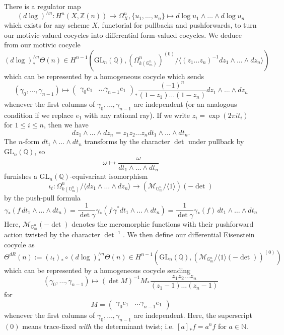 \documentclass[10pt]{amsart}
\theoremstyle{definition}
\newcommand{\Q}{\mathbb{Q}}
\newcommand{\G}{\mathbb{G}}
\newcommand{\GL}{\mathrm{GL}}
\numberwithin{equation}{section}
\begin{document}
    There is a regulator map \cite[\S 2.1.5]{LW}
    \[
    (d\log)^{\wedge n}: H^n(X,\mathbb{Z}(n)) \to \Omega^n_X, \{u_1,\ldots, u_n\} \mapsto d\log u_1 \wedge \ldots \wedge d\log u_n
    \]
    which exists for any scheme $X$, functorial for pullbacks and pushforwards, to turn our motivic-valued cocycles into differential form-valued cocycles. We deduce from our motivic cocycle
    \[
    (d\log)^{\wedge n}_* \Theta(n) \in H^{n-1}(\GL_n(\Q), (\Omega^n_{k(\G_m^n)})^{(0)}/\langle (z_1\ldots z_n)^{-1} dz_1\wedge \ldots \wedge dz_n\rangle)
    \]
    which can be represented by a homogeneous cocycle which sends
    \[
    (\gamma_0,\ldots, \gamma_{n-1}) \mapsto \begin{pmatrix} \gamma_0 e_1 & \ldots \gamma_{n-1}e_1\end{pmatrix}_* \frac{(-1)^n}{(1-z_1)\ldots (1-z_n)}dz_1\wedge \ldots \wedge dz_n
    \]
    whenever the first columns of $\gamma_0,\ldots, \gamma_{n-1}$ are independent (or an analogous condition if we replace $e_1$ with any rational ray). If we write $z_i=\exp(2\pi i t_i)$ for $1\le i \le n$, then we have
    \[
    dz_1\wedge \ldots \wedge dz_n = z_1z_2\ldots z_n dt_1\wedge \ldots \wedge dt_n.
    \]
    The $n$-form $dt_1\wedge \ldots \wedge dt_n$ transforms by the character $\det$ under pullback by $\GL_n(\Q)$, so 
    \[
    \omega \mapsto \frac{\omega}{dt_1\wedge \ldots \wedge dt_n}
    \]
    furnishes a $\GL_n(\Q)$-equivariant isomorphism
    \[
    \iota_t: \Omega^n_{k(\G_m^n)}/\langle dz_1\wedge \ldots \wedge dz_n\rangle \to (\mathcal{M}_{\G_m^n}/\langle 1\rangle )(-\det)
    \]
    by the push-pull formula
    \[
    \gamma_*(f\, dt_1\wedge \ldots \wedge dt_n) = \frac{1}{\det \gamma} \gamma_*(f\, \gamma^* dt_1\wedge \ldots \wedge dt_n)=\frac{1}{\det \gamma} \gamma_*(f)\,  dt_1\wedge \ldots \wedge dt_n
    \]
    Here, $\mathcal{M}_{\G_m^n}(-\det)$ denotes the meromorphic functions with their pushforward action twisted by the character $\det^{-1}$. We then define our differential Eisenstein cocycle as
    \[
        \Theta^{dR}(n) := (\iota_t)_*\circ (d\log)^{\wedge n}_* \Theta(n) \in H^{n-1}(\GL_n(\Q), (\mathcal{M}_{\G_m^n}/\langle 1\rangle (-\det))^{(0)})
    \]
    which can be represented by a homogeneous cocycle sending
    \[
    (\gamma_0,\ldots, \gamma_{n-1}) \mapsto (\det M)^{-1} M_* \frac{z_1z_2\ldots z_n}{(z_1-1)\ldots (z_n-1)}
    \]
    for \[
    M=\begin{pmatrix} \gamma_0 e_1 & \ldots \gamma_{n-1}e_1\end{pmatrix}
    \]
    whenever the first columns of $\gamma_0,\ldots, \gamma_{n-1}$ are independent. Here, the superscript $(0)$ means trace-fixed \emph{with} the determinant twist; i.e. $[a]_*f = a^nf$ for $a\in \mathbb{N}$.
    
\end{document}
